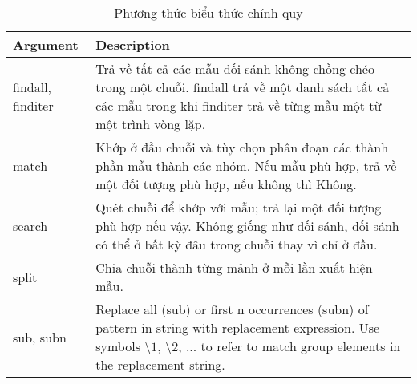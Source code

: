 \begin{table}[h]
\centering
    \begin{tabular}{l|p{10cm}}
       \textbf{Argument}  & \textbf{Description} \\ \hline
       findall, finditer  & Trả về tất cả các mẫu đối sánh không chồng chéo trong một chuỗi. findall trả về một danh sách tất cả các mẫu trong khi finditer trả về từng mẫu một từ một trình vòng lặp. \\ 
       match &  Khớp  ở đầu chuỗi và tùy chọn phân đoạn các thành phần mẫu thành các nhóm. Nếu mẫu phù hợp, trả về một đối tượng phù hợp, nếu không thì Không.\\
       search & Quét chuỗi để khớp với mẫu; trả lại một đối tượng phù hợp nếu vậy. Không giống như đối sánh, đối sánh có thể ở bất kỳ đâu trong chuỗi thay vì chỉ ở đầu. \\
       split &  Chia chuỗi thành từng mảnh ở mỗi lần xuất hiện mẫu.\\
        sub, subn & Replace all (sub) or first n occurrences (subn) of pattern in string with replacement expression. Use symbols $\setminus1$, $\setminus2$, ... to refer to match group elements in the replacement string. \par
  \end{tabular}
    \caption{Phương thức biểu thức chính quy}
    \label{tab:table3}
\end{table}

